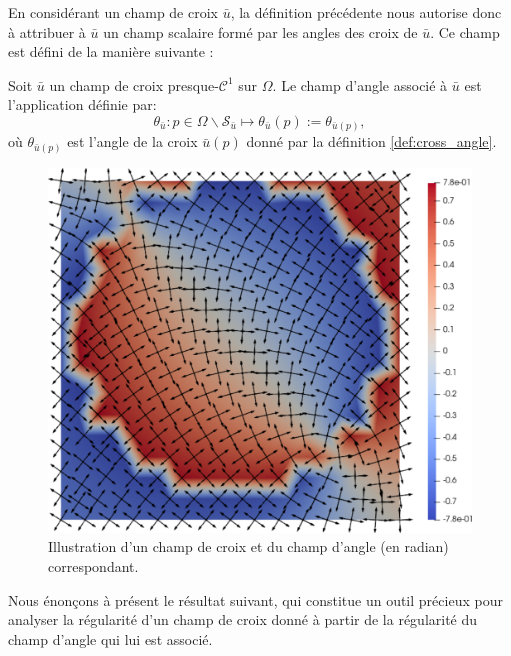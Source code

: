 
En considérant un champ de croix $\bar{u}$, la définition précédente nous autorise donc à attribuer à $\bar{u}$ un champ scalaire formé par les angles des croix de $\bar{u}$. Ce champ est défini de la manière suivante :

\begin{definition}
    Soit $\bar{u}$ un champ de croix presque-$\mathcal{C}^1$ sur $\Omega$. Le champ d'angle associé à $\bar{u}$ est l'application définie par:
    $$\theta_{\bar{u}}:p\in\Omega\backslash\mathcal{S}_{\bar{u}}\longmapsto\theta_{\bar{u}}(p):=\theta_{\bar{u}(p)},$$
    où $\theta_{\bar{u}(p)}$ est l'angle de la croix $\bar{u}(p)$ donné par la définition \ref{def:cross_angle}.
\end{definition}

\begin{figure}[!h]
  \centering
  \includegraphics[scale=0.32]{images/cross_ang_field.pdf}
  \caption{Illustration d'un champ de croix et du champ d'angle (en radian) correspondant.}
  \label{fig:cross_field}
\end{figure}


Nous énonçons à présent le résultat suivant, qui constitue un outil précieux pour analyser la régularité d'un champ de croix donné à partir de la régularité du champ d'angle qui lui est associé.

